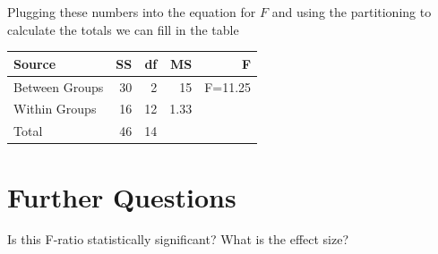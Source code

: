 \documentclass{tufte-handout}
\begin{document}
\begin{fullwidth}
Plugging these numbers into the equation for $F$ and using the partitioning to calculate the totals we can fill in the table

\begin{table}
  \centering
  \selectfont
  \begin{tabular}{lrrrr}
    \toprule
    Source &  SS &  df & MS &  F \\
    \midrule
    Between Groups & 30 & 2 & 15 & F=11.25 \\
    Within Groups & 16& 12&1.33 & \\
    Total & 46& 14& & \\
    \bottomrule
  \end{tabular}
  \label{tab:normaltab}
\end{table}

\section{Further Questions}
Is this F-ratio statistically significant? What is the effect size?

\end{fullwidth}
\end{document}
